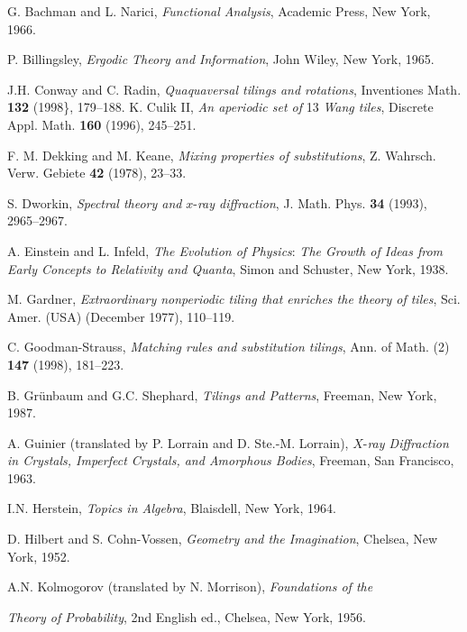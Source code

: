 \documentclass[reqno]{stml-l}
\theoremstyle{plain}
\theoremstyle{definition}
\numberwithin{equation}{chapter}
\begin{document}
\backmatter

\begin{thebibliography}{99}
 G. Bachman and L. Narici, \emph{Functional Analysis}, Academic Press, New York, 1966.

 P. Billingsley, \emph{Ergodic Theory and Information}, John Wiley, New York, 1965.

 J.H. Conway and C. Radin, \emph{Quaquaversal tilings and rotations}, Inventiones Math. \textbf{132} (1998\}, 179--188.
 K. Culik II, \emph{An aperiodic set of} 13 \emph{Wang tiles}, Discrete Appl. Math. \textbf{160} (1996), 245--251.

 F. M. Dekking and M. Keane, \emph{Mixing properties of substitutions}, Z. Wahrsch. Verw. Gebiete \textbf{42} (1978), 23--33.

 S. Dworkin, \emph{Spectral theory and} $x$-\emph{ray diffraction}, J. Math. Phys. \textbf{34} (1993), 2965--2967.

 A. Einstein and L. Infeld, \emph{The Evolution of Physics}: \emph{The Growth of Ideas from Early Concepts to Relativity and Quanta}, Simon and Schuster, New York, 1938.

 M. Gardner, \emph{Extraordinary nonperiodic tiling that enriches the theory of tiles}, Sci. Amer. (USA) (December 1977), 110--119.

 C. Goodman-Strauss, \emph{Matching rules and substitution tilings}, Ann. of Math. (2) \textbf{147} (1998), 181--223.

 B. Gr\"{u}nbaum and G.C. Shephard, \emph{Tilings and Patterns}, Freeman, New York, 1987.

 A. Guinier (translated by P. Lorrain and D. Ste.-M. Lorrain), $X$-\emph{ray Diffraction in Crystals, Imperfect Crystals, and Amorphous Bodies}, Freeman, San Francisco, 1963.

 I.N. Herstein, \emph{Topics in Algebra}, Blaisdell, New York, 1964.

 D. Hilbert and S. Cohn-Vossen, \emph{Geometry and the Imagination}, Chelsea, New York, 1952.

 A.N. Kolmogorov (translated by N. Morrison), \emph{Foundations of the}

\emph{Theory of Probability}, 2nd English ed., Chelsea, New York, 1956.


\end{thebibliography}
\end{document}
